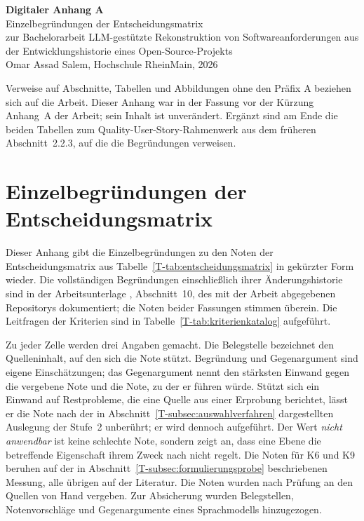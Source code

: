 \documentclass[11pt,a4paper]{report}
\begin{document}
\begin{center}
{\Large\bfseries Digitaler Anhang A}\\[0.5em]
{\large Einzelbegründungen der Entscheidungsmatrix}\\[1em]
zur Bachelorarbeit \glqq LLM-gestützte Rekonstruktion von
Softwareanforderungen aus der Entwicklungshistorie eines
Open-Source-Projekts\grqq{}\\
Omar Assad Salem, Hochschule RheinMain, 2026
\end{center}

\noindent Verweise auf Abschnitte, Tabellen und Abbildungen ohne den
Präfix A beziehen sich auf die Arbeit. Dieser Anhang war in der Fassung
vor der Kürzung Anhang~A der Arbeit; sein Inhalt ist unverändert. Ergänzt
sind am Ende die beiden Tabellen zum Quality-User-Story-Rahmenwerk aus
dem früheren Abschnitt~2.2.3, auf die die Begründungen verweisen.

\bigskip
\appendix

\chapter{Einzelbegründungen der Entscheidungsmatrix}
\label{cha:anhang-einzelbegruendungen}

Dieser Anhang gibt die Einzelbegründungen zu den Noten der
Entscheidungsmatrix aus Tabelle~\ref{T-tab:entscheidungsmatrix} in
gekürzter Form wieder. Die vollständigen Begründungen einschließlich
ihrer Änderungshistorie sind in der Arbeitsunterlage
, Abschnitt~10, des mit der Arbeit
abgegebenen Repositorys dokumentiert; die Noten beider Fassungen
stimmen überein. Die Leitfragen der Kriterien sind in
Tabelle~\ref{T-tab:kriterienkatalog} aufgeführt.

Zu jeder Zelle werden drei Angaben gemacht. Die Belegstelle bezeichnet
den Quelleninhalt, auf den sich die Note stützt. Begründung und
Gegenargument sind eigene Einschätzungen; das Gegenargument
nennt den stärksten Einwand gegen die vergebene Note und die Note, zu
der er führen würde. Stützt sich ein Einwand auf Restprobleme, die eine
Quelle aus einer Erprobung berichtet, lässt er die Note nach der in
Abschnitt~\ref{T-subsec:auswahlverfahren} dargestellten Auslegung der
Stufe~2 unberührt; er wird dennoch aufgeführt. Der Wert \emph{nicht
anwendbar} ist keine schlechte Note, sondern zeigt an, dass eine Ebene
die betreffende Eigenschaft ihrem Zweck nach nicht regelt. Die Noten für
K6 und K9 beruhen auf der in Abschnitt~\ref{T-subsec:formulierungsprobe}
beschriebenen Messung, alle übrigen auf der Literatur.
Die Noten wurden nach Prüfung an den Quellen von Hand vergeben. Zur
Absicherung wurden Belegstellen, Notenvorschläge und Gegenargumente
eines Sprachmodells hinzugezogen.
\end{document}
